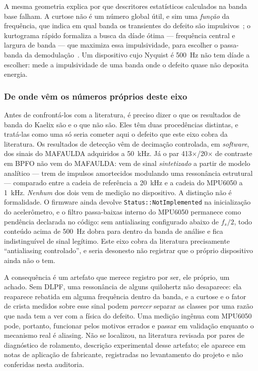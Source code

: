 \documentclass[11pt,a4paper]{article}
\begin{document}
A mesma geometria explica por que descritores estatísticos calculados na banda base
falham. A curtose não é um número global útil, e sim uma \emph{função} da frequência, que
indica em qual banda os transientes do defeito são impulsivos~\cite{antoni2006}; o
kurtograma rápido formaliza a busca da díade ótima --- frequência central e largura de
banda --- que maximiza essa impulsividade, para escolher o passa-banda da
demodulação~\cite{antoni2007}. Um dispositivo cujo Nyquist é \SI{500}{\hertz} não tem
díade a escolher: mede a impulsividade de uma banda onde o defeito quase não deposita
energia.

\subsubsection{De onde vêm os números próprios deste eixo}

Antes de confrontá-los com a literatura, é preciso dizer o que os resultados de banda do
Kaelix são e o que não são. Eles têm duas procedências distintas, e tratá-las como uma só
seria cometer aqui o defeito que este eixo cobra da literatura. Os resultados de
detecção vêm de decimação controlada, em \emph{software}, dos sinais do MAFAULDA
adquiridos a \SI{50}{\kilo\hertz}. Já o par \num{413}$\times$/\num{20}$\times$ de contraste
em BPFO não vem do MAFAULDA: vem de sinal \emph{sintetizado} a partir de modelo
analítico --- trem de impulsos amortecidos modulando uma ressonância estrutural ---
comparado entre a cadeia de referência a \SI{20}{\kilo\hertz} e a cadeia do MPU6050 a
\SI{1}{\kilo\hertz}. \emph{Nenhum} dos dois vem de medição no dispositivo. A distinção não é formalidade. O firmware ainda devolve
\texttt{Status::NotImplemented} na inicialização do acelerômetro, e o filtro passa-baixas
interno do MPU6050 permanece como pendência declarada no código: sem antialiasing
configurado abaixo de $f_s/2$, todo conteúdo acima de \SI{500}{\hertz} dobra para dentro
da banda de análise e fica indistinguível de sinal legítimo. Este eixo cobra da literatura
precisamente ``antialiasing controlado'', e seria desonesto não registrar que o próprio
dispositivo ainda não o tem.

A consequência é um artefato que merece registro por ser, ele próprio, um achado. Sem
DLPF, uma ressonância de alguns quilohertz não desaparece: ela reaparece rebatida em
alguma frequência dentro da banda, e a curtose e o fator de crista medidos sobre esse
sinal podem \emph{parecer} separar as classes por uma razão que nada tem a ver com a
física do defeito. Uma medição ingênua com MPU6050 pode, portanto, funcionar pelos motivos
errados e passar em validação enquanto o mecanismo real é aliasing. Não se localizou,
na literatura revisada por pares de diagnóstico de rolamento, descrição experimental desse
artefato; ele aparece em notas de aplicação de fabricante, registradas no levantamento do
projeto e não conferidas nesta auditoria.
\end{document}

